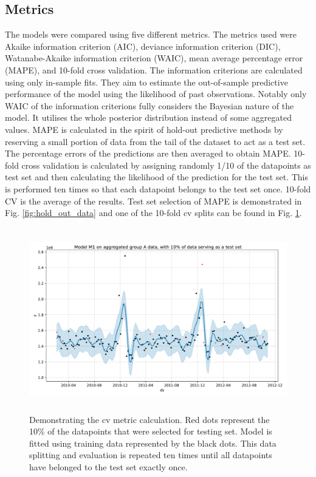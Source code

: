 \documentclass[english, 12pt, a4paper, sci, utf8, a-1b, online]{aaltothesis}
\begin{document}


\subsection{Metrics}

The models were compared using five different metrics. The metrics used were Akaike information criterion (AIC), deviance information criterion (DIC), Watanabe-Akaike information criterion (WAIC), mean average percentage error (MAPE), and 10-fold cross validation. The information criterions are calculated using only in-sample fits. They aim to estimate the out-of-sample predictive performance of the model using the likelihood of past observations. Notably only WAIC of the information criterions fully considers the Bayesian nature of the model. It utilises the whole posterior distribution instead of some aggregated values. MAPE is calculated in the spirit of hold-out predictive methods by reserving a small portion of data from the tail of the dataset to act as a test set. The percentage errors of the predictions are then averaged to obtain MAPE. 10-fold cross validation is calculated by assigning randomly 1/10 of the datapoints as test set and then calculating the likelihood of the prediction for the test set. This is performed ten times so that each datapoint belongs to the test set once. 10-fold CV is the average of the results. Test set selection of MAPE is demonstrated in Fig. \ref{fig:hold_out_data} and one of the 10-fold cv splits can be found in Fig. \ref{fig:cv_demo}. 

\begin{figure}[htb]
	\centering
	\includegraphics[height=8cm]{../plots/forecasts/cv_metric_demo_plot.pdf}
	\caption{Demonstrating the cv metric calculation. Red dots represent the 10\% of the datapoints that were selected for testing set. Model is fitted using training data represented
	by the black dots. This data splitting and evaluation is repeated ten times until all datapoints have belonged to the test set exactly once.}
	\label{fig:cv_demo}
\end{figure}
\end{document}
